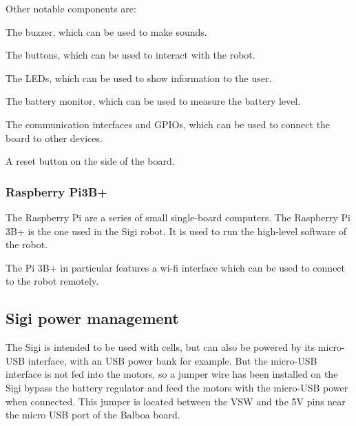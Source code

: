 \documentclass{article}
\begin{document}
Other notable components are:

\begin{list}{-}{}
    \item The buzzer, which can be used to make sounds.

    \item The buttons, which can be used to interact with the robot.

    \item The LEDs, which can be used to show information to the user.

    \item The battery monitor, which can be used to measure the battery level.

    \item The communication interfaces and GPIOs, which can be used to connect the board to
        other devices.

    \item A reset button on the side of the board.
\end{list}

\subsubsection{Raspberry Pi3B+}
The Raspberry Pi are a series of small single-board computers.
The Raspberry Pi 3B+ is the one used in the Sigi robot.
It is used to run the high-level software of the robot.

The Pi 3B+ in particular features a wi-fi interface which can be used to connect to the robot
remotely.

\subsection{Sigi power management}
The Sigi is intended to be used with cells, but can also be powered by its micro-USB interface,
with an USB power bank for example.
But the micro-USB interface is not fed into the motors, so a jumper wire has been installed on the
Sigi bypass the battery regulator and feed the motors with the micro-USB power when connected.
This jumper is located between the VSW and the 5V pins near the micro USB port of the Balboa board.
\end{document}
